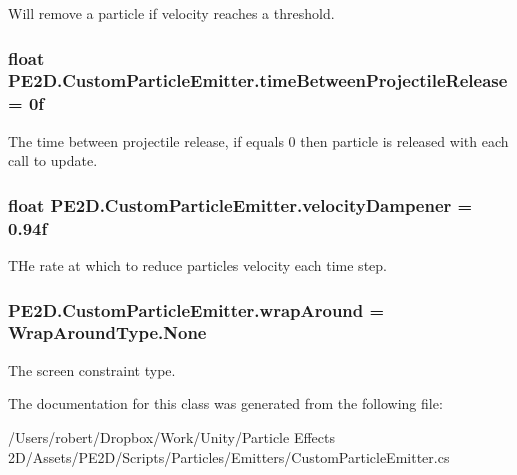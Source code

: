 Will remove a particle if velocity reaches a threshold. 

\hypertarget{class_p_e2_d_1_1_custom_particle_emitter_a87bb71bb6472767b7532a19daa0d37e6}{}
\subsubsection[{time\+Between\+Projectile\+Release}]{\setlength{\rightskip}{0pt plus 5cm}float P\+E2\+D.\+Custom\+Particle\+Emitter.\+time\+Between\+Projectile\+Release = 0f}\label{class_p_e2_d_1_1_custom_particle_emitter_a87bb71bb6472767b7532a19daa0d37e6}


The time between projectile release, if equals 0 then particle is released with each call to update. 

\hypertarget{class_p_e2_d_1_1_custom_particle_emitter_a04f3d21e5ff2436efce1e0f1a8777b03}{}
\subsubsection[{velocity\+Dampener}]{\setlength{\rightskip}{0pt plus 5cm}float P\+E2\+D.\+Custom\+Particle\+Emitter.\+velocity\+Dampener = 0.\+94f}\label{class_p_e2_d_1_1_custom_particle_emitter_a04f3d21e5ff2436efce1e0f1a8777b03}


T\+He rate at which to reduce particles velocity each time step. 

\hypertarget{class_p_e2_d_1_1_custom_particle_emitter_a894bcd6445f3443f1261ae98b50d097d}{}
\subsubsection[{wrap\+Around}]{ P\+E2\+D.\+Custom\+Particle\+Emitter.\+wrap\+Around = Wrap\+Around\+Type.\+None}\label{class_p_e2_d_1_1_custom_particle_emitter_a894bcd6445f3443f1261ae98b50d097d}


The screen constraint type. 



The documentation for this class was generated from the following file\+:\begin{DoxyCompactItemize}
\item 
/\+Users/robert/\+Dropbox/\+Work/\+Unity/\+Particle Effects 2\+D/\+Assets/\+P\+E2\+D/\+Scripts/\+Particles/\+Emitters/Custom\+Particle\+Emitter.\+cs\end{DoxyCompactItemize}
